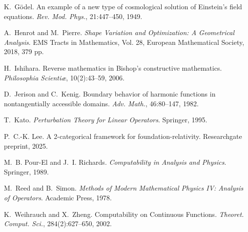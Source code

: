 \documentclass[11pt]{article}
\theoremstyle{definition}\newtheorem{definition}[theorem]{Definition}
\theoremstyle{remark}\newtheorem{remark}[theorem]{Remark}
\begin{document}
\begin{thebibliography}{99}
K.~Gödel.
\newblock An example of a new type of cosmological solution of {E}instein's field equations.
\newblock \emph{Rev. Mod. Phys.}, 21:447--450, 1949.

A.~Henrot and M.~Pierre.
\newblock \emph{Shape Variation and Optimization: A Geometrical Analysis}.
\newblock EMS Tracts in Mathematics, Vol. 28, European Mathematical Society, 2018, 379 pp.

H.~Ishihara.
\newblock Reverse mathematics in {B}ishop's constructive mathematics.
\newblock \emph{Philosophia Scientiæ}, 10(2):43--59, 2006.

D.~Jerison and C.~Kenig.
\newblock Boundary behavior of harmonic functions in nontangentially accessible domains.
\newblock \emph{Adv. Math.}, 46:80--147, 1982.

T.~Kato.
\newblock \emph{Perturbation Theory for Linear Operators}.
\newblock Springer, 1995.

P.~C.-K. Lee.
\newblock A 2-categorical framework for foundation-relativity.
\newblock Researchgate preprint, 2025.

M.~B. Pour-El and J.~I. Richards.
\newblock \emph{Computability in Analysis and Physics}.
\newblock Springer, 1989.

M.~Reed and B.~Simon.
\newblock \emph{Methods of Modern Mathematical Physics IV: Analysis of Operators}.
\newblock Academic Press, 1978.

K.~Weihrauch and X.~Zheng.
\newblock Computability on Continuous Functions.
\newblock \emph{Theoret. Comput. Sci.}, 284(2):627--650, 2002.

\end{thebibliography}
\end{document}
